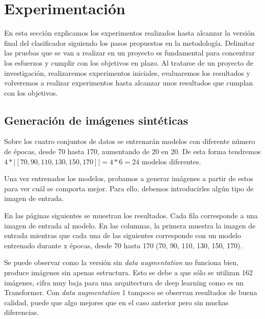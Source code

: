 \chapter{Experimentación}
En esta sección explicamos los experimentos realizados hasta alcanzar la versión final del clasificador siguiendo los pasos propuestos en la metodología. Delimitar las pruebas que se van a realizar en un proyecto es fundamental para concentrar los esfuerzos y cumplir con los objetivos en plazo. Al tratarse de un proyecto de investigación, realizaremos experimentos iniciales, evaluaremos los resultados y volveremos a realizar experimentos hasta alcanzar unos resultados que cumplan con los objetivos.

\section{Generación de imágenes sintéticas}

Sobre los cuatro conjuntos de datos se entrenarán modelos con diferente número de épocas, desde 70 hasta 170, aumentando de 20 en 20. De esta forma tendremos $4 * |[70, 90, 110, 130, 150, 170]| = 4 * 6 = 24$ modelos diferentes.

Una vez entrenados los modelos, probamos a generar imágenes a partir de estos para ver cuál se comporta mejor. Para ello, debemos introducirles algún tipo de imagen de entrada. 

En las páginas siguientes se muestran los resultados. Cada fila corresponde a una imagen de entrada al modelo. En las columnas, la primera muestra la imagen de entrada mientras que cada una de las siguientes corresponde con un modelo entrenado durante x épocas, desde 70 hasta 170 (70, 90, 110, 130, 150, 170).

Se puede observar como la versión sin \textit{data augmentation} no funciona bien, produce imágenes sin apenas estructura. Esto se debe a que sólo se utilizan 162 imágenes, cifra muy baja para una arquitectura de deep learning como es un Transformer. Con \textit{data augmentation} 1 tampoco se observan resultados de buena calidad, puede que algo mejores que en el caso anterior pero sin muchas diferencias.

